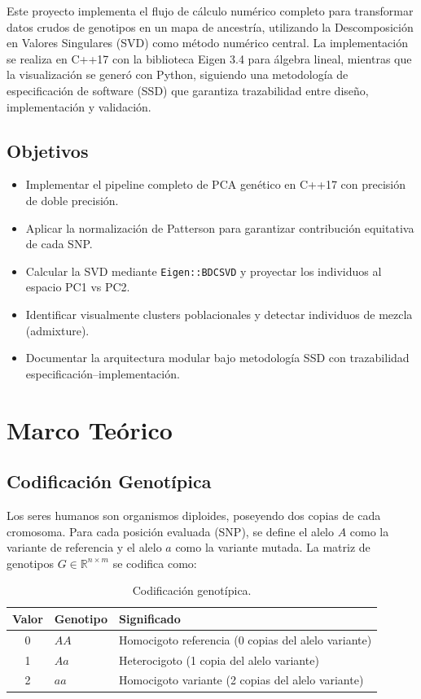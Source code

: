 \documentclass[12pt,a4paper]{article}
\theoremstyle{definition}
\newcommand{\R}{\mathbb{R}}
\begin{document}
Este proyecto implementa el flujo de c\'{a}lculo num\'{e}rico completo para transformar datos crudos de genotipos en un mapa de ancestr\'{i}a, utilizando la Descomposici\'{o}n en Valores Singulares (SVD) como m\'{e}todo num\'{e}rico central. La implementaci\'{o}n se realiza en C++17 con la biblioteca Eigen 3.4 para \'algebra lineal,  mientras que la visualizaci\'{o}n se gener\'{o} con Python, siguiendo una metodolog\'{i}a de especificaci\'{o}n de software (SSD) que garantiza trazabilidad entre dise\~{n}o, implementaci\'{o}n y validaci\'{o}n.

\subsection{Objetivos}
\begin{itemize}
    \item Implementar el pipeline completo de PCA gen\'{e}tico en C++17 con precisi\'{o}n de doble precisi\'{o}n.
    \item Aplicar la normalizaci\'{o}n de Patterson para garantizar contribuci\'{o}n equitativa de cada SNP.
    \item Calcular la SVD mediante \texttt{Eigen::BDCSVD} y proyectar los individuos al espacio PC1 vs PC2.
    \item Identificar visualmente clusters poblacionales y detectar individuos de mezcla (admixture).
    \item Documentar la arquitectura modular bajo metodolog\'{i}a SSD con trazabilidad especificaci\'{o}n--implementaci\'{o}n.
\end{itemize}

\section{Marco Te\'{o}rico}\label{sec:teoria}

\subsection{Codificaci\'{o}n Genot\'{i}pica}

Los seres humanos son organismos diploides, poseyendo dos copias de cada cromosoma. Para cada posici\'{o}n evaluada (SNP), se define el alelo $A$ como la variante de referencia y el alelo $a$ como la variante mutada. La matriz de genotipos $G \in \R^{n \times m}$ se codifica como:

\begin{table}[H]
\centering
\caption{Codificaci\'{o}n genot\'{i}pica.}
\label{tab:codificacion}
\begin{tabular}{@{}cll@{}}
\toprule
\textbf{Valor} & \textbf{Genotipo} & \textbf{Significado} \\ \midrule
0 & $AA$ & Homocigoto referencia (0 copias del alelo variante) \\
1 & $Aa$ & Heterocigoto (1 copia del alelo variante) \\
2 & $aa$ & Homocigoto variante (2 copias del alelo variante) \\ \bottomrule
\end{tabular}
\end{table}
\end{document}
